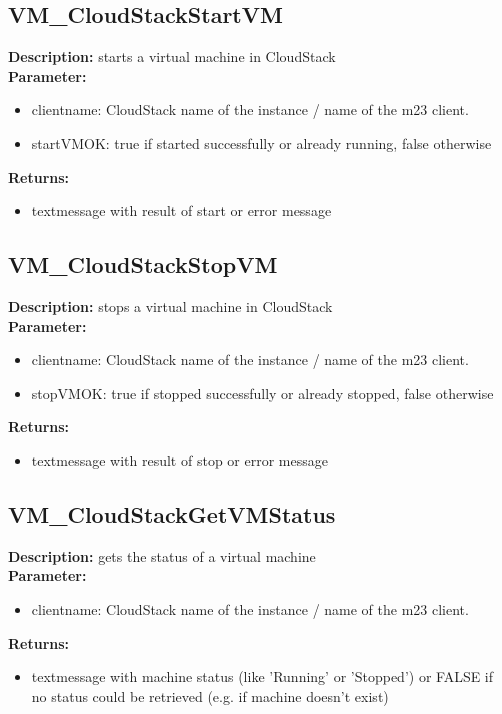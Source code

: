 \subsection{VM\_CloudStackStartVM}
\textbf{Description:} starts a virtual machine in CloudStack\\
\textbf{Parameter:}
\begin{itemize}
\item clientname: CloudStack name of the instance / name of the m23 client.
\item startVMOK: true if started successfully or already running, false otherwise
\end{itemize}
\textbf{Returns:}
\begin{itemize}
\item textmessage with result of start or error message
\end{itemize}

\subsection{VM\_CloudStackStopVM}
\textbf{Description:} stops a virtual machine in CloudStack\\
\textbf{Parameter:}
\begin{itemize}
\item clientname: CloudStack name of the instance / name of the m23 client.
\item stopVMOK: true if stopped successfully or already stopped, false otherwise
\end{itemize}
\textbf{Returns:}
\begin{itemize}
\item textmessage with result of stop or error message
\end{itemize}

\subsection{VM\_CloudStackGetVMStatus}
\textbf{Description:} gets the status of a virtual machine\\
\textbf{Parameter:}
\begin{itemize}
\item clientname: CloudStack name of the instance / name of the m23 client.
\end{itemize}
\textbf{Returns:}
\begin{itemize}
\item textmessage with machine status (like 'Running' or 'Stopped') or FALSE if no status could be retrieved (e.g. if machine doesn't exist)
\end{itemize}

